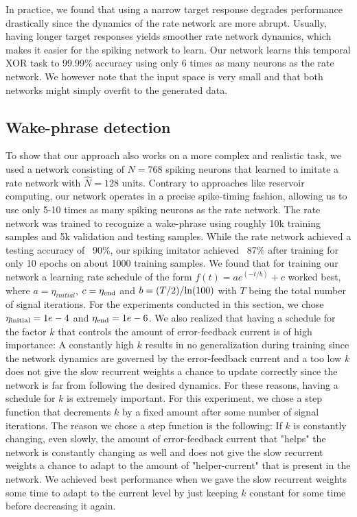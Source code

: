 \documentclass[twoside,11pt,titlepage]{article}
\begin{document}
In practice, we found that using a narrow target response degrades performance drastically
since the dynamics of the rate network are more abrupt. Usually, having longer target responses
yields smoother rate network dynamics, which makes it easier for the spiking network to learn.
Our network learns this temporal XOR task to 99.99\% accuracy using only 6 times as many neurons
as the rate network. We however note that the input space is very small and that both networks
might simply overfit to the generated data.

\subsection{Wake-phrase detection}
To show that our approach also works on a more complex and realistic task, we used a network consisting of $N=768$ spiking
neurons that learned to imitate a rate network with $\hat{N}=128$ units. Contrary to approaches like
reservoir computing, our network operates in a precise spike-timing fashion, allowing us to use
only 5-10 times as many spiking neurons as the rate network. The rate network was trained to recognize
a wake-phrase using roughly 10k training samples and 5k validation and testing samples. While the rate network
achieved a testing accuracy of ~90\%, our spiking imitator achieved ~87\% after training for only 10 epochs on about 1000
training samples. We found that for training our network a learning rate schedule of the form $f(t)=a e^{(-t/b)}+c$
worked best, where $a=\eta_{initial}$, $c=\eta_\textnormal{end}$ and $b = (T/2) / \textnormal{ln}(100)$ with $T$ being the
total number of signal iterations. For the experiments conducted in this section, we chose $\eta_\textnormal{initial}=1e-4$ and $\eta_\textnormal{end}=1e-6$.
We also realized that having a schedule for the factor $k$ that controls the amount of error-feedback current is of high importance:
A constantly high $k$ results in no generalization during training since the network dynamics are governed by the error-feedback current and a too low
$k$ does not give the slow recurrent weights a chance to update correctly since the network is far from following the desired dynamics.
For these reasons, having a schedule for $k$ is extremely important. For this experiment, we chose a step function that decrements $k$ by a fixed amount
after some number of signal iterations. The reason we chose a step function is the following: 
If $k$ is constantly changing, even slowly, the amount of error-feedback current that "helps" the network
is constantly changing as well and does not give the slow recurrent weights a chance to adapt to the amount of "helper-current" that is
present in the network. We achieved best performance when we gave the slow recurrent weights some time to adapt to the current level by just
keeping $k$ constant for some time before decreasing it again.
\end{document}
